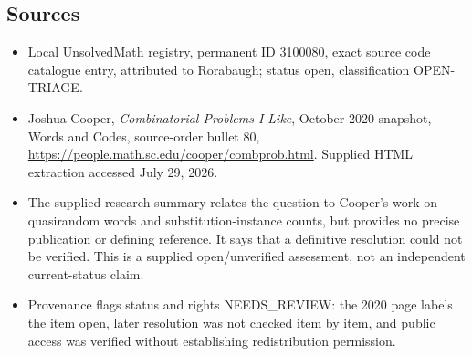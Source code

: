 \documentclass[11pt]{article}
\begin{document}
\subsection{Sources}
\begin{itemize}
\item Local UnsolvedMath registry, permanent ID 3100080, exact source code catalogue entry, attributed to Rorabaugh; status open, classification OPEN-TRIAGE.
\item Joshua Cooper, \emph{Combinatorial Problems I Like}, October 2020 snapshot, Words and Codes, source-order bullet 80, \url{https://people.math.sc.edu/cooper/combprob.html}. Supplied HTML extraction accessed July 29, 2026.
\item The supplied research summary relates the question to Cooper's work on quasirandom words and substitution-instance counts, but provides no precise publication or defining reference. It says that a definitive resolution could not be verified. This is a supplied open/unverified assessment, not an independent current-status claim.
\item Provenance flags status and rights NEEDS\_REVIEW: the 2020 page labels the item open, later resolution was not checked item by item, and public access was verified without establishing redistribution permission.
\end{itemize}
\end{document}
